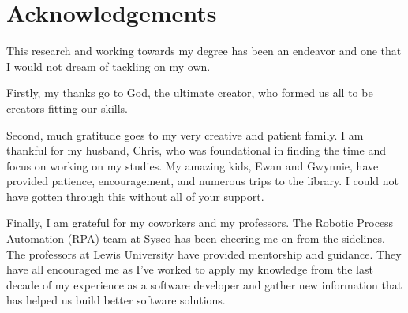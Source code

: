 \section*{Acknowledgements} \label{sectionAcknowledgements}

This research and working towards my degree has been an endeavor and one that I would not dream of tackling on my own.

Firstly, my thanks go to God, the ultimate creator, who formed us all to be creators fitting our skills.

Second, much gratitude goes to my very creative and patient family. I am thankful for my husband, Chris, who was foundational in finding the time and focus on working on my studies. My amazing kids, Ewan and Gwynnie, have provided patience, encouragement, and numerous trips to the library. I could not have gotten through this without all of your support.

Finally, I am grateful for my coworkers and my professors. The Robotic Process Automation (RPA) team at Sysco has been cheering me on from the sidelines. The professors at Lewis University have provided mentorship and guidance. They have all encouraged me as I've worked to apply my knowledge from the last decade of my experience as a software developer and gather new information that has helped us build better software solutions.
